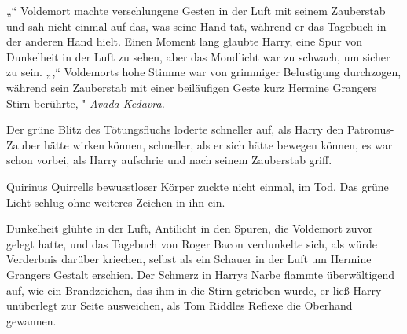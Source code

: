 „“
Voldemort machte verschlungene Gesten in der Luft mit seinem Zauberstab und sah nicht einmal auf das, was seine Hand tat, während er das Tagebuch in der anderen Hand hielt. Einen Moment lang glaubte Harry, eine Spur von Dunkelheit in der Luft zu sehen, aber das Mondlicht war zu schwach, um sicher zu sein.
„,“ Voldemorts hohe Stimme war von grimmiger Belustigung durchzogen, während sein Zauberstab mit einer beiläufigen Geste kurz Hermine Grangers Stirn berührte, " \emph{Avada Kedavra.}

Der grüne Blitz des Tötungsfluchs loderte schneller auf, als Harry den Patronus-Zauber hätte wirken können, schneller, als er sich hätte bewegen können, es war schon vorbei, als Harry aufschrie und nach seinem Zauberstab griff.

Quirinus Quirrells bewusstloser Körper zuckte nicht einmal, im Tod. Das grüne Licht schlug ohne weiteres Zeichen in ihn ein.

Dunkelheit glühte in der Luft, Antilicht in den Spuren, die Voldemort zuvor gelegt hatte, und das Tagebuch von Roger Bacon verdunkelte sich, als würde Verderbnis darüber kriechen, selbst als ein Schauer in der Luft um Hermine Grangers Gestalt erschien.
Der Schmerz in Harrys Narbe flammte überwältigend auf, wie ein Brandzeichen, das ihm in die Stirn getrieben wurde, er ließ Harry unüberlegt zur Seite ausweichen, als Tom Riddles Reflexe die Oberhand gewannen.

